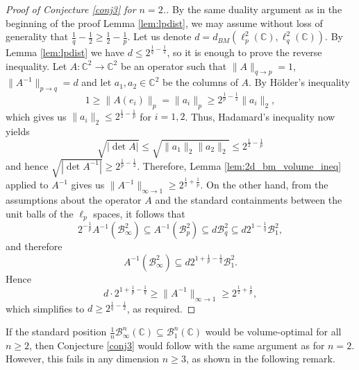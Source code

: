 \documentclass[12pt, a4paper]{article}
\theoremstyle{plain} %
\theoremstyle{definition} %
\theoremstyle{remark} %
\begin{document}
\begin{proof}[Proof of Conjecture \ref{conj3} for $n=2$.]

By the same duality argument as in the beginning of the proof Lemma \ref{lem:lpdist}, we may assume without loss of generality that $\frac{1}{q}-\frac{1}{2} \geq \frac{1}{2}-\frac{1}{p}$. Let us denote $d = d_{BM}(\ell_p^2(\mathbb{C}), \ell_q^2(\mathbb{C}))$. By Lemma \ref{lem:lpdist} we have $d \leq 2^{\frac{1}{q}-\frac{1}{2}}$, so it is enough to prove the reverse inequality. Let $A: \mathbb{C}^2 \to \mathbb{C}^2$ be an operator such that $\|A\|_{q \to p} = 1$, $\|A^{-1}\|_{p \to q} = d$ and let $a_1, a_2 \in \mathbb{C}^2$ be the columns of $A$. By H\"older's inequality
$$1 \geq \|A(e_i)\|_p = \|a_i\|_p \geq 2^{\frac{1}{p}-\frac{1}{2}} \|a_i\|_2,$$
which gives us $\|a_i\|_2 \leq 2^{\frac{1}{2}-\frac{1}{p}}$ for $i=1, 2$. Thus, Hadamard's inequality now yields
$$\sqrt{|\det A|} \leq \sqrt{ \|a_1\|_2 \|a_2\|_2} \leq 2^{\frac{1}{2}-\frac{1}{p}}$$
and hence $\sqrt{|\det A^{-1}|} \geq 2^{\frac{1}{p}-\frac{1}{2}}$. Therefore, Lemma \ref{lem:2d_bm_volume_ineq} applied to $A^{-1}$ gives us $\|A^{-1}\|_{\infty \to 1} \geq 2^{\frac{1}{2}+\frac{1}{p}}$. On the other hand, from the assumptions about the operator $A$ and the standard containments between the unit balls of the $\ell_p$ spaces, it follows that
$$2^{-\frac{1}{p}} A^{-1}(\mathcal{B}_{\infty}^2) \subseteq A^{-1}(\mathcal{B}_p^2) \subseteq d \mathcal{B}_q^2 \subseteq d2^{1-\frac{1}{q}} \mathcal{B}_1^2,$$
and therefore
$$A^{-1} (\mathcal{B}_{\infty}^2) \subseteq d 2^{1+\frac{1}{p}-\frac{1}{q}} \mathcal{B}_1^2.$$
Hence
$$d \cdot 2^{1+\frac{1}{p}-\frac{1}{q}} \geq \|A^{-1}\|_{\infty \to 1} \geq 2^{\frac{1}{2}+\frac{1}{p}},$$
which simplifies to $d \geq 2^{\frac{1}{q} - \frac{1}{2}}$, as required.

\end{proof}

If the standard position $\frac{1}{n} \mathcal{B}_{\infty}^n(\mathbb{C}) \subseteq \mathcal{B}_1^n(\mathbb{C})$ would be volume-optimal for all $ n \geq 2$, then Conjecture \ref{conj3} would follow with the same argument as for $n=2$. However, this fails in any dimension $n \geq 3$, as shown in the following remark.
\end{document}
